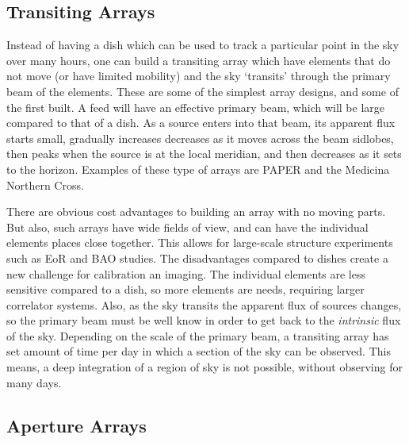 \documentclass[usenatbib,usegraphicx]{article}
\begin{document}
\subsection{Transiting Arrays}

Instead of having a dish which can be used to track a particular point in the sky over many hours, one can build a transiting array which have elements that do not move (or have limited mobility) and the sky `transits' through the primary beam of the elements.
These are some of the simplest array designs, and some of the first built.
A feed will have an effective primary beam, which will be large compared to that of a dish.
As a source enters into that beam, its apparent flux starts small, gradually increases decreases as it moves across the beam sidlobes, then peaks when the source is at the local meridian, and then decreases as it sets to the horizon.
Examples of these type of arrays are PAPER and the Medicina Northern Cross.

There are obvious cost advantages to building an array with no moving parts.
But also, such arrays have wide fields of view, and can have the individual elements places close together.
This allows for large-scale structure experiments such as EoR and BAO studies.
The disadvantages compared to dishes create a new challenge for calibration an imaging.
The individual elements are less sensitive compared to a dish, so more elements are needs, requiring larger correlator systems.
Also, as the sky transits the apparent flux of sources changes, so the primary beam must be well know in order to get back to the \emph{intrinsic} flux of the sky.
Depending on the scale of the primary beam, a transiting array has set amount of time per day in which a section of the sky can be observed.
This means, a deep integration of a region of sky is not possible, without observing for many days.

\subsection{Aperture Arrays}
\end{document}
